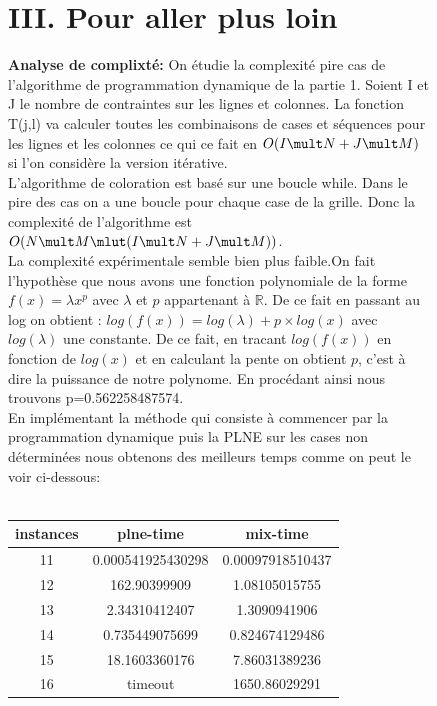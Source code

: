\documentclass[a4paper]{memoir}
\begin{document}
\begin{figure}[h]
  \section{III. Pour aller plus loin}
  \textbf{Analyse de complixté:} On étudie la complexité pire cas de l'algorithme de programmation dynamique de la partie 1.
  Soient I et J le nombre de contraintes sur les lignes et colonnes.
  La fonction T(j,l) va calculer toutes les combinaisons de cases et séquences  pour les lignes et les colonnes ce qui ce fait en $O(I \mult N + J \mult M)$ si l'on considère la version itérative. \\
  L'algorithme de coloration est basé sur une boucle while.
  Dans le pire des cas on a une boucle pour chaque case de la grille. Donc la complexité de l'algorithme est $O(N\mult M\mlut (I \mult N + J \mult M))$.\\
  La complexité expérimentale semble bien plus faible.On fait l'hypothèse que nous avons une fonction polynomiale de la forme $f(x) = \lambda x^p$ avec $\lambda$ et $p$ appartenant à $\mathbb{R}$. De ce fait en passant au log on obtient : $log(f(x)) = log(\lambda) + p \times log(x)$ avec $log(\lambda)$ une constante. De ce fait, en tracant $log(f(x))$ en fonction de $log(x)$ et en calculant la pente on obtient $p$, c'est à dire la puissance de notre polynome.
  En procédant ainsi nous trouvons p=0.562258487574. \\
  
En implémentant la méthode qui consiste à commencer par la programmation dynamique puis la PLNE sur les cases non déterminées nous obtenons des meilleurs temps comme on peut le voir ci-dessous:\\\\
\begin{center}
\begin{tabular}{|c||c||c|}
\hline
instances & plne-time & mix-time \\ 
\hline
11 & 0.000541925430298 & 0.00097918510437 \\ 
\hline
12 & 162.90399909 & 1.08105015755 \\ 
\hline
13 & 2.34310412407 & 1.3090941906 \\ 
\hline
14 & 0.735449075699 & 0.824674129486 \\ 
\hline
15 & 18.1603360176 & 7.86031389236 \\ 
\hline
16 & timeout & 1650.86029291 \\ 
\hline
\end{tabular}
\end{center}


\end{figure}
\end{document}
